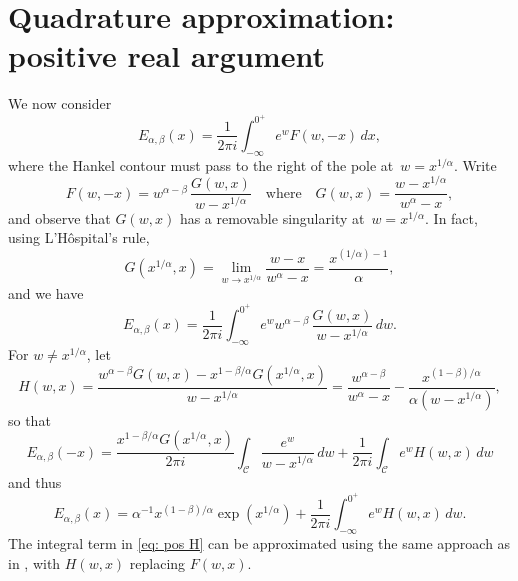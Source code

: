 \documentclass[12pt,a4paper]{article}
\begin{document}
\section{Quadrature approximation: positive real argument}
We now consider
\[
E_{\alpha,\beta}(x)=\frac{1}{2\pi i}\int_{-\infty}^{0^+}
    e^wF(w,-x)\,dx,
\]
where the Hankel contour must pass to the right of the pole at~$w=x^{1/\alpha}$.
Write
\[
F(w,-x)=w^{\alpha-\beta}\,\frac{G(w,x)}{w-x^{1/\alpha}}\quad\text{where}\quad
G(w,x)=\frac{w-x^{1/\alpha}}{w^\alpha-x},
\]
and observe that $G(w,x)$ has a removable singularity at~$w=x^{1/\alpha}$. In 
fact, using L'H\^ospital's rule,
\[
G(x^{1/\alpha},x)=\lim_{w\to x^{1/\alpha}}
    \frac{w-x}{w^\alpha-x}=\frac{x^{(1/\alpha)-1}}{\alpha},
\]
and we have
\[
E_{\alpha,\beta}(x)=\frac{1}{2\pi i}\int_{-\infty}^{0^+}e^w w^{\alpha-\beta}\,
    \frac{G(w,x)}{w-x^{1/\alpha}}\,dw.
\]
For $w\ne x^{1/\alpha}$, let
\[
H(w,x)=\frac{w^{\alpha-\beta}G(w,x)-x^{1-\beta/\alpha}G(x^{1/\alpha},x)}%
{w-x^{1/\alpha}}
=\frac{w^{\alpha-\beta}}{w^\alpha-x}
    -\frac{x^{(1-\beta)/\alpha}}{\alpha(w-x^{1/\alpha})},
\]
so that
\[
E_{\alpha,\beta}(-x)=\frac{x^{1-\beta/\alpha}G(x^{1/\alpha},x)}{2\pi i}
\int_{\mathcal{C}}\frac{e^w}{w-x^{1/\alpha}}\,dw
    +\frac{1}{2\pi i}\int_{\mathcal{C}}e^wH(w,x)\,dw
\]
and thus
\begin{equation}\label{eq: pos H}
E_{\alpha,\beta}(x)=\alpha^{-1}x^{(1-\beta)/\alpha}\exp(x^{1/\alpha})
    +\frac{1}{2\pi i}\int_{-\infty}^{0^+}e^w H(w,x)\,dw.
\end{equation}
The integral term in \eqref{eq: pos H} can be approximated using the same 
approach as in , with $H(w,x)$ replacing $F(w,x)$.
\end{document}
